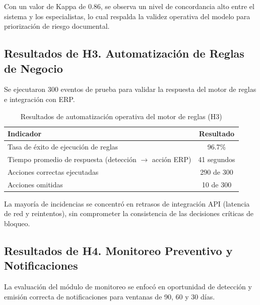 \documentclass[12pt]{article}
\begin{document}
Con un valor de Kappa de 0.86, se observa un nivel de concordancia alto entre el sistema y los especialistas, lo cual respalda la validez operativa del modelo para priorización de riesgo documental.

\subsection{Resultados de H3. Automatización de Reglas de Negocio}

Se ejecutaron 300 eventos de prueba para validar la respuesta del motor de reglas e integración con ERP.

\begin{table}[htbp]
\centering
\caption{Resultados de automatización operativa del motor de reglas (H3)}
\vspace{0.3cm}
\label{tab:resultados-h3-reglas}
\begin{tabularx}{\textwidth}{|>{\raggedright\arraybackslash}X|c|}
\hline
\textbf{Indicador} & \textbf{Resultado} \\
\hline
Tasa de éxito de ejecución de reglas & 96.7\% \\
\hline
Tiempo promedio de respuesta (detección $\rightarrow$ acción ERP) & 41 segundos \\
\hline
Acciones correctas ejecutadas & 290 de 300 \\
\hline
Acciones omitidas & 10 de 300 \\
\hline
\end{tabularx}
\end{table}

La mayoría de incidencias se concentró en retrasos de integración API (latencia de red y reintentos), sin comprometer la consistencia de las decisiones críticas de bloqueo.

\subsection{Resultados de H4. Monitoreo Preventivo y Notificaciones}

La evaluación del módulo de monitoreo se enfocó en oportunidad de detección y emisión correcta de notificaciones para ventanas de 90, 60 y 30 días.
\end{document}
